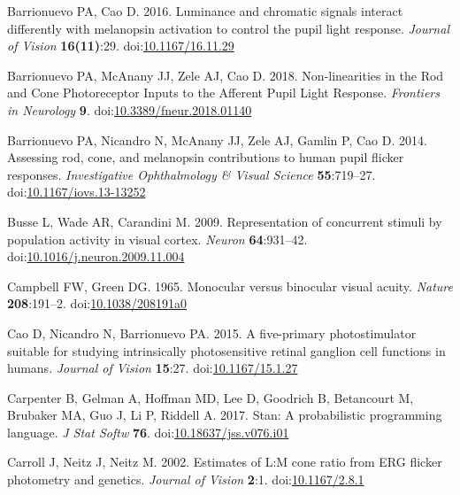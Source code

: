 \documentclass[
]{article}
\newlength{\cslhangindent}
\newlength{\cslentryspacingunit} %
\newenvironment{CSLReferences}[2] %
 {%
  \setlength{\parindent}{0pt}
  \ifodd #1
  \let\oldpar\par
  \def\par{\hangindent=\cslhangindent\oldpar}
  \fi
  \setlength{\parskip}{#2\cslentryspacingunit}
 }%
 {}
\begin{document}
\begin{CSLReferences}{1}{0}
\leavevmode{}%
Barrionuevo PA, Cao D. 2016. Luminance and chromatic signals interact differently with melanopsin activation to control the pupil light response. \emph{Journal of Vision} \textbf{16(11)}:29. doi:\href{https://doi.org/10.1167/16.11.29}{10.1167/16.11.29}

\leavevmode{}%
Barrionuevo PA, McAnany JJ, Zele AJ, Cao D. 2018. Non-linearities in the {Rod} and {Cone} {Photoreceptor} {Inputs} to the {Afferent} {Pupil} {Light} {Response}. \emph{Frontiers in Neurology} \textbf{9}. doi:\href{https://doi.org/10.3389/fneur.2018.01140}{10.3389/fneur.2018.01140}

\leavevmode{}%
Barrionuevo PA, Nicandro N, McAnany JJ, Zele AJ, Gamlin P, Cao D. 2014. Assessing rod, cone, and melanopsin contributions to human pupil flicker responses. \emph{Investigative Ophthalmology \& Visual Science} \textbf{55}:719--27. doi:\href{https://doi.org/10.1167/iovs.13-13252}{10.1167/iovs.13-13252}

\leavevmode{}%
Busse L, Wade AR, Carandini M. 2009. Representation of concurrent stimuli by population activity in visual cortex. \emph{Neuron} \textbf{64}:931--42. doi:\href{https://doi.org/10.1016/j.neuron.2009.11.004}{10.1016/j.neuron.2009.11.004}

\leavevmode{}%
Campbell FW, Green DG. 1965. Monocular versus binocular visual acuity. \emph{Nature} \textbf{208}:191--2. doi:\href{https://doi.org/10.1038/208191a0}{10.1038/208191a0}

\leavevmode{}%
Cao D, Nicandro N, Barrionuevo PA. 2015. A five-primary photostimulator suitable for studying intrinsically photosensitive retinal ganglion cell functions in humans. \emph{Journal of Vision} \textbf{15}:27. doi:\href{https://doi.org/10.1167/15.1.27}{10.1167/15.1.27}

\leavevmode{}%
Carpenter B, Gelman A, Hoffman MD, Lee D, Goodrich B, Betancourt M, Brubaker MA, Guo J, Li P, Riddell A. 2017. Stan: A probabilistic programming language. \emph{J Stat Softw} \textbf{76}. doi:\href{https://doi.org/10.18637/jss.v076.i01}{10.18637/jss.v076.i01}

\leavevmode{}%
Carroll J, Neitz J, Neitz M. 2002. Estimates of {L}:{M} cone ratio from {ERG} flicker photometry and genetics. \emph{Journal of Vision} \textbf{2}:1. doi:\href{https://doi.org/10.1167/2.8.1}{10.1167/2.8.1}


\end{CSLReferences}
\end{document}
